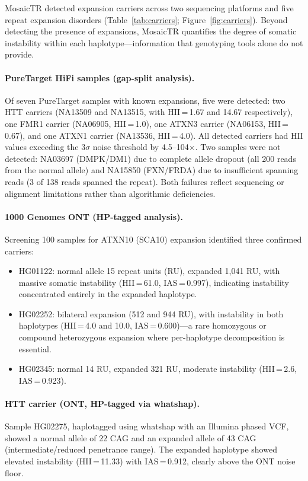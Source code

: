 \documentclass[12pt]{article}
\begin{document}
MosaicTR detected expansion carriers across two sequencing platforms and five repeat expansion disorders (Table~\ref{tab:carriers}; Figure~\ref{fig:carriers}).
Beyond detecting the presence of expansions, MosaicTR quantifies the degree of somatic instability within each haplotype---information that genotyping tools alone do not provide.

\paragraph{PureTarget HiFi samples (gap-split analysis).}
Of seven PureTarget samples with known expansions, five were detected: two HTT carriers (NA13509 and NA13515, with HII\,=\,1.67 and 14.67 respectively), one FMR1 carrier (NA06905, HII\,=\,1.0), one ATXN3 carrier (NA06153, HII\,=\,0.67), and one ATXN1 carrier (NA13536, HII\,=\,4.0).
All detected carriers had HII values exceeding the 3$\sigma$ noise threshold by 4.5--104$\times$.
Two samples were not detected: NA03697 (DMPK/DM1) due to complete allele dropout (all 200 reads from the normal allele) and NA15850 (FXN/FRDA) due to insufficient spanning reads (3 of 138 reads spanned the repeat).
Both failures reflect sequencing or alignment limitations rather than algorithmic deficiencies.

\paragraph{1000 Genomes ONT (HP-tagged analysis).}
Screening 100 samples for ATXN10 (SCA10) expansion identified three confirmed carriers:
\begin{itemize}
\item HG01122: normal allele 15 repeat units (RU), expanded 1{,}041 RU, with massive somatic instability (HII\,=\,61.0, IAS\,=\,0.997), indicating instability concentrated entirely in the expanded haplotype.
\item HG02252: bilateral expansion (512 and 944 RU), with instability in both haplotypes (HII\,=\,4.0 and 10.0, IAS\,=\,0.600)---a rare homozygous or compound heterozygous expansion where per-haplotype decomposition is essential.
\item HG02345: normal 14 RU, expanded 321 RU, moderate instability (HII\,=\,2.6, IAS\,=\,0.923).
\end{itemize}

\paragraph{HTT carrier (ONT, HP-tagged via whatshap).}
Sample HG02275, haplotagged using whatshap with an Illumina phased VCF, showed a normal allele of 22 CAG and an expanded allele of 43 CAG (intermediate/reduced penetrance range).
The expanded haplotype showed elevated instability (HII\,=\,11.33) with IAS\,=\,0.912, clearly above the ONT noise floor.
\end{document}
